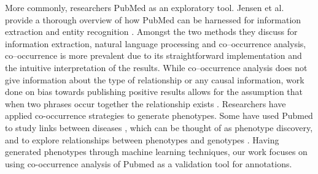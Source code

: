 \documentclass{sig-alternate-05-2015}
\begin{document}
More commonly, researchers PubMed as an exploratory tool.
Jensen et al. provide a thorough overview of how PubMed can be harnessed for information extraction and entity recognition \cite{jensen2006literature}.
Amongst the two methods they discuss for information extraction, natural language processing and co--occurrence analysis, co--occurrence is more prevalent due to its straightforward implementation and the intuitive interpretation of the results.
While co--occurrence analysis does not give information about the type of relationship or any causal information, work done on bias towards publishing positive results allows for the assumption that when two phrases occur together the relationship exists \cite{dickersin1990existence,easterbrook1991publication,stern1997publication}.
Researchers have applied co-occurrence strategies to generate phenotypes. 
Some have used Pubmed to study links between diseases \cite{rajpal2014mining}, which can be thought of as phenotype discovery, and to explore relationships between phenotypes and genotypes \cite{pletscher2015diseases}.
Having generated phenotypes through machine learning techniques, our work focuses on using co-occurrence analysis of Pubmed as a validation tool for annotations.

\end{document}
